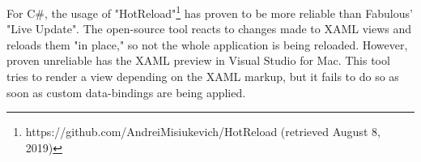 For C\#, the usage of "HotReload"\footnote{https://github.com/AndreiMisiukevich/HotReload (retrieved August 8, 2019)} has proven to be more reliable than Fabulous' "Live Update". The open-source tool reacts to changes made to XAML views and reloads them "in place," so not the whole application is being reloaded. However, proven unreliable has the XAML preview in Visual Studio for Mac. This tool tries to render a view depending on the XAML markup, but it fails to do so as soon as custom data-bindings are being applied.
